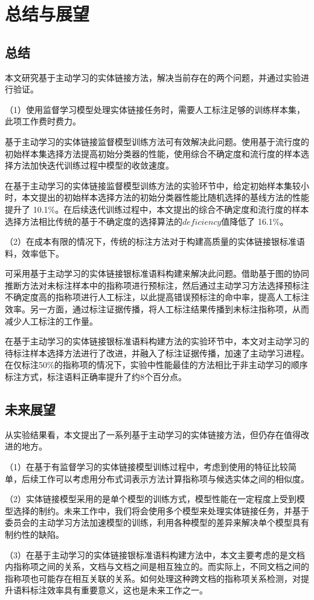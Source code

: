 \chapter{总结与展望}
\section{总结}
本文研究基于主动学习的实体链接方法，解决当前存在的两个问题，并通过实验进行验证。

（1）使用监督学习模型处理实体链接任务时，需要人工标注足够的训练样本集，此项工作费时费力。

基于主动学习的实体链接监督模型训练方法可有效解决此问题。使用基于流行度的初始样本集选择方法提高初始分类器的性能，使用综合不确定度和流行度的样本选择方法加快迭代训练过程中模型的收敛速度。

在基于主动学习的实体链接监督模型训练方法的实验环节中，给定初始样本集较小时，本文提出的初始样本选择方法的初始分类器性能比随机选择的基线方法的性能提升了 10.1\%。在后续迭代训练过程中，本文提出的综合不确定度和流行度的样本选择方法相比传统的基于不确定度的选择算法的$deficiency$值降低了 16.1\%。

（2）在成本有限的情况下，传统的标注方法对于构建高质量的实体链接银标准语料，效率低下。

可采用基于主动学习的实体链接银标准语料构建来解决此问题。借助基于图的协同推断方法对未标注样本中的指称项进行预标注，然后通过主动学习方法选择预标注不确定度高的指称项进行人工标注，以此提高错误预标注的命中率，提高人工标注效率。另一方面，通过标注证据传播，将人工标注结果传播到未标注指称项，从而减少人工标注的工作量。

在基于主动学习的实体链接银标准语料构建方法的实验环节中，本文对主动学习的待标注样本选择方法进行了改进，并融入了标注证据传播，加速了主动学习进程。在仅标注50\%的指称项的情况下，实验中性能最佳的方法相比于非主动学习的顺序标注方式，标注语料正确率提升了约8个百分点。

\section{未来展望}
从实验结果看，本文提出了一系列基于主动学习的实体链接方法，但仍存在值得改进的地方。

（1）在基于有监督学习的实体链接模型训练过程中，考虑到使用的特征比较简单，后续工作可以考虑用分布式词表示方法计算指称项与候选实体之间的相似度。

（2）实体链接模型采用的是单个模型的训练方式，模型性能在一定程度上受到模型选择的制约。未来工作中，我们将会使用多个模型来处理实体链接任务，并基于委员会的主动学习方法加速模型的训练，利用各种模型的差异来解决单个模型具有制约性的缺陷。

（3）在基于主动学习的实体链接银标准语料构建方法中，本文主要考虑的是文档内指称项之间的关系，文档与文档之间是相互独立的。而实际上，不同文档之间的指称项也可能存在相互关联的关系。如何处理这种跨文档的指称项关系检测，对提升语料标注效率具有重要意义，这也是未来工作之一。
